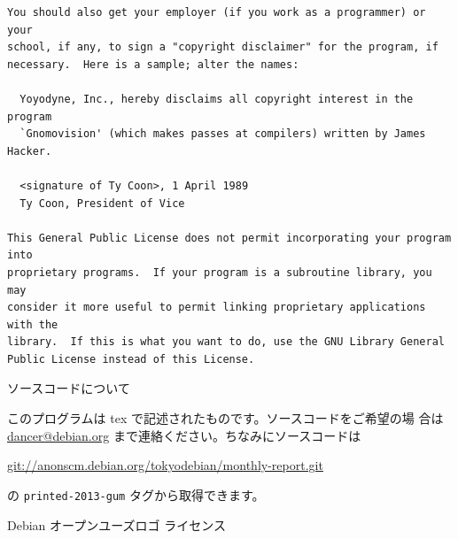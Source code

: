 \documentclass[mingoth,a4paper,twoside]{jsarticle}
\begin{document}
\begin{multicols}{2}
\begin{fontsize}{6}{6}
\begin{verbatim}
You should also get your employer (if you work as a programmer) or your
school, if any, to sign a "copyright disclaimer" for the program, if
necessary.  Here is a sample; alter the names:

  Yoyodyne, Inc., hereby disclaims all copyright interest in the program
  `Gnomovision' (which makes passes at compilers) written by James Hacker.

  <signature of Ty Coon>, 1 April 1989
  Ty Coon, President of Vice

This General Public License does not permit incorporating your program into
proprietary programs.  If your program is a subroutine library, you may
consider it more useful to permit linking proprietary applications with the
library.  If this is what you want to do, use the GNU Library General
Public License instead of this License.
 \end{verbatim}
 \end{fontsize}
\end{multicols}

\begin{center}
ソースコードについて
\end{center}

このプログラムは tex で記述されたものです。ソースコードをご希望の場
合は \url{dancer@debian.org} まで連絡ください。ちなみにソースコードは
\begin{center}
  \url{git://anonscm.debian.org/tokyodebian/monthly-report.git}
\end{center}
の \texttt{printed-2013-gum} タグから取得できます。


\begin{center}
Debian オープンユーズロゴ ライセンス
\end{center}
\end{document}
